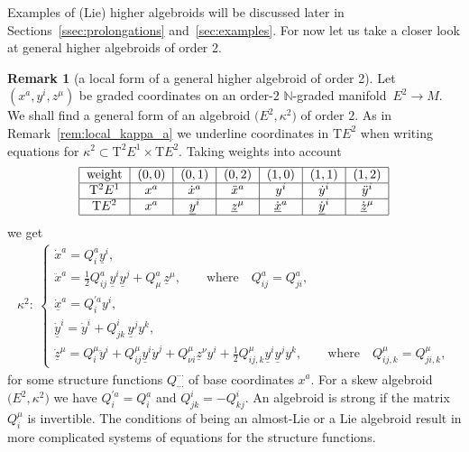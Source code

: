 \documentclass[10pt,a4paper]{amsart}
\newcommand{\grB}{{$\N$-graded manifold}}
\newcommand{\degree}{{order}}
\newcommand{\N}{\mathbb{N}}
\newcommand{\und}{\underline}
\newcommand{\ra}{\rightarrow}
\newcommand{\T}{\mathrm{T}} %
\newcommand{\TT}[1]{\mathrm{T}^{#1}} %
\numberwithin{equation}{section}
\theoremstyle{definition}
\newtheorem{rem}[thm]{Remark}
\begin{document}
Examples of (Lie) higher algebroids will be discussed later in Sections~\ref{ssec:prolongations} and~\ref{sec:examples}. For now let us take a closer look at general higher algebroids of order 2.
\begin{rem}[a local form of a general higher algebroid of order 2]\label{rem:local_order_2}
Let $(x^a, y^i, z^\mu)$ be graded coordinates on an \degree-$2$ \grB\ $E^2\ra M$.
We shall find a general form of an algebroid $\big(E^2, \kappa^2\big)$ of order $2$. As in Remark~\ref{rem:local_kappa_a} we underline coordinates in $\T E^2$ when writing equations for $\kappa^2\subset \TT{2} E^1 \times \T E^2$. Taking weights into account
\begin{gather}\label{e:T2E_TE2_weights}
\begin{tabular}{|c|c|c|c|c|c|c|}\hline
\text{weight}& $(0,0)$ & $(0,1)$ & $(0,2)$ & $(1,0)$ & $(1,1)$ & $(1,2)$ \\ \hline
$\TT{2} E^1$ & $x^a$ & $\dot{x}^a$ & $\ddot{x}^a$ & $y^i$ & $\dot{y}^i$ & $\ddot{y}^i$ \\ \hline
$\T E^2$ & $x^a$ & $\und{y}^i$ & $\und{z}^\mu$ & $\dot{\und{x}}^a$ & $\dot{\und{y}}^i$ & $\dot{\und{z}}^\mu$ \\ \hline
\end{tabular}
\end{gather}
we get
\begin{gather}\label{e:local_kappa2}
\kappa^2\colon \
\begin{cases}
\dot{x}^a = Q^a_i \und{y}^i, \\
\ddot{x}^a = \frac{1}{2} Q^a_{ij}\,\und{y}^i\und{y}^j + Q^a_\mu\,\und{z}^\mu, \qquad \text{where} \quad Q^a_{ij}=Q^a_{ji}, \\
\dot{\und{x}}^a = Q^{'a}_i y^i,\\
\dot{\und{y}}^i = \dot{y}^i + Q^i_{jk}\,\und{y}^j y^k,\\
\dot{\und{z}}^\mu = Q^\mu_i \ddot{y}^i + Q^\mu_{ij} \und{y}^i \dot{y}^j + Q^\mu_{\nu i}\und{z}^\nu y^i + \frac{1}{2} Q^\mu_{ij,k} \und{y}^i\und{y}^j y^k, \qquad \text{where} \quad Q^\mu_{ij,k}=Q^\mu_{ji,k},
\end{cases}
\end{gather}
for some structure functions $Q^{\cdots}_{\cdots}$ of base coordinates $x^a$. For a skew algebroid $\big(E^2, \kappa^2\big)$ we have $Q^{'a}_i= Q^a_i$ and $Q_{jk}^i = - Q_{kj}^i$. An algebroid is strong if the matrix $Q^\mu_i$ is invertible. The conditions of being an almost-Lie or a Lie algebroid result in more complicated systems of equations for the structure functions.
\end{rem}
\end{document}
